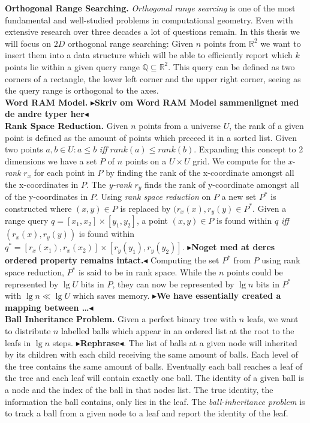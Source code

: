 \documentclass[twoside,11pt,openright]{report}
\newcommand{\todo}[1]{{\color[rgb]{.5,0,0}\textbf{$\blacktriangleright$#1$\blacktriangleleft$}}}
\begin{document}
\noindent \textbf{Orthogonal Range Searching.} \emph{Orthogonal range searcing} is one of the most fundamental and well-studied problems in computational geometry. Even with extensive research over three decades a lot of questions remain. In this thesis we will focus on $2D$ orthogonal range searching: Given $n$ points from $\mathbb{R}^2$ we want to insert them into a data structure which will be able to efficiently report which $k$ points lie within a given query range $\mathbb{Q} \subseteq \mathbb{R}^2$. This query can be defined as two corners of a rectangle, the lower left corner and the upper right corner, seeing as the query range is orthogonal to the axes. \\

\noindent \textbf{Word RAM Model.} \todo{Skriv om Word RAM Model sammenlignet med de andre typer her}\\

\noindent \textbf{Rank Space Reduction.} Given $n$ points from a universe $U$, the rank of a given point is defined as the amount of points which preceed it in a sorted list. Given two points $a,b \in U: a \leq b$ \emph{iff} $rank(a) \leq rank(b)$. Expanding this concept to 2 dimensions we have a set $P$ of $n$ points on a $U \times U$ grid. We compute for the \emph{x-rank} $r_x$ for each point in $P$ by finding the rank of the x-coordinate amongst all the x-coordinates in $P$. The \emph{y-rank} $r_y$ finds the rank of y-coordinate amongst all of the y-coordinates in $P$. Using \emph{rank space reduction} on $P$ a new set $P^*$ is constructed where $(x,y) \in P$ is replaced by $(r_x(x), r_y(y) \in P^*$. Given a range query $q = [x_1, x_2] \times [y_1, y_2]$, a point $(x,y) \in P$ is found within $q$ \emph{iff} $(r_x(x), r_y(y))$ is found within $q^* = [r_x(x_1), r_x(x_2)] \times [r_y(y_1), r_y(y_2)]$. \todo{Noget med at deres ordered property remains intact.} Computing the set $P^*$ from $P$ using rank space reduction, $P^*$ is said to be in rank space. While the $n$ points could be represented by $\lg U$ bits in $P$, they can now be represented by $\lg n$ bits in $P^*$ with $\lg n \ll \lg U$ which saves memory. \todo{We have essentially created a mapping between \dots } \\

\noindent \textbf{Ball Inheritance Problem.} Given a perfect binary tree with $n$ leafs, we want to distribute $n$ labelled balls which appear in an ordered list at the root to the leafs in $\lg n$ steps. \todo{Rephrase}. The list of balls at a given node will inherited by its children with each child receiving the same amount of balls. Each level of the tree contains the same amount of balls. Eventually each ball reaches a leaf of the tree and each leaf will contain exactly one ball. The identity of a given ball is a node and the index of the ball in that nodes list. The true identity, the information the ball contains, only lies in the leaf. The \emph{ball-inheritance problem} is to track a ball from a given node to a leaf and report the identity of the leaf. \\
\end{document}
